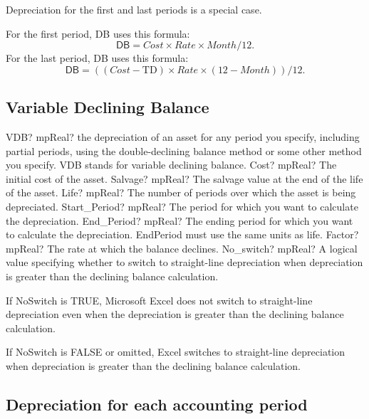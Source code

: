 Depreciation for the first and last periods is a special case. 

For the first period, DB uses this formula:
\begin{equation}
\textsf{DB} = Cost \times Rate \times Month / 12. 
\end{equation}
For the last period, DB uses this formula:
\begin{equation}
\textsf{DB} = ((Cost - \text{TD}) \times Rate \times (12 - Month)) / 12.
\end{equation}




\subsection{Variable Declining Balance}

\begin{mpFunctionsExtract}
	\mpWorksheetFunctionSevenNotImplemented
	{VDB? mpReal? the depreciation of an asset for any period you specify, including partial periods, using the double-declining balance method or some other method you specify. VDB stands for variable declining balance.}
	{Cost? mpReal?  The initial cost of the asset.}
	{Salvage? mpReal? The salvage value at the end of the life of the asset.}
	{Life? mpReal? The number of periods over which the asset is being depreciated.}
	{Start\_Period? mpReal? The period for which you want to calculate the depreciation.}
	{End\_Period? mpReal? The ending period for which you want to calculate the depreciation. EndPeriod must use the same units as life.}
	{Factor? mpReal? The rate at which the balance declines.}
	{No\_switch? mpReal? A logical value specifying whether to switch to straight-line depreciation when depreciation is greater than the declining balance calculation.}
\end{mpFunctionsExtract}


\vspace{0.3cm}
If NoSwitch is TRUE, Microsoft Excel does not switch to straight-line depreciation even when the depreciation is greater than the declining balance calculation.

If NoSwitch is FALSE or omitted, Excel switches to straight-line depreciation when depreciation is greater than the declining balance calculation.



\subsection{Depreciation for each accounting period}


